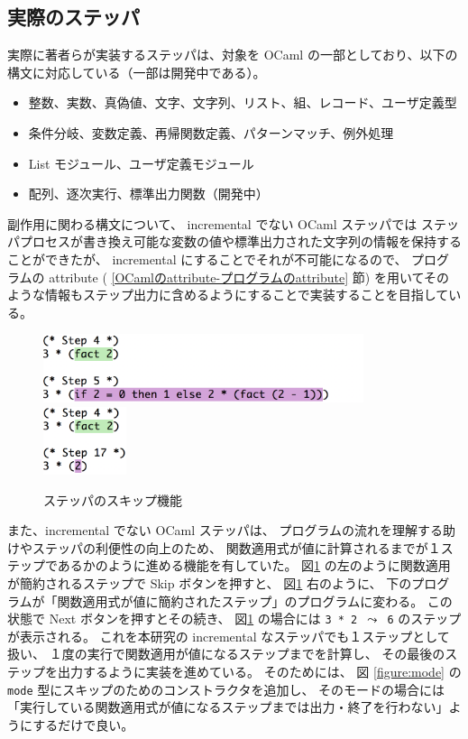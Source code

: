 \subsection{実際のステッパ}
\label{実装-実際のステッパ}

実際に著者らが実装するステッパは、対象を OCaml の一部としており、以下の構文に対応している（一部は開発中である）。
\begin{itemize}
\item 整数、実数、真偽値、文字、文字列、リスト、組、レコード、ユーザ定義型
\item 条件分岐、変数定義、再帰関数定義、パターンマッチ、例外処理
\item List モジュール、ユーザ定義モジュール
\item 配列、逐次実行、標準出力関数（開発中）
\end{itemize}

副作用に関わる構文について、
incremental でない OCaml ステッパでは
ステッパプロセスが書き換え可能な変数の値や標準出力された文字列の情報を保持することができたが、
incremental にすることでそれが不可能になるので、
プログラムの attribute ( \ref{OCamlのattribute-プログラムのattribute} 節)
を用いてそのような情報もステップ出力に含めるようにすることで実装することを目指している。

\begin{figure}
  \includegraphics[height=2cm]{5/skip1.png}
  \includegraphics[height=2cm]{5/skip2.png}
  \caption{ステッパのスキップ機能}
  \label{figure:skip}
\end{figure}

また、incremental でない OCaml ステッパは、
プログラムの流れを理解する助けやステッパの利便性の向上のため、
関数適用式が値に計算されるまでが１ステップであるかのように進める機能を有していた。
図\ref{figure:skip} の左のように関数適用が簡約されるステップで Skip ボタンを押すと、
図\ref{figure:skip} 右のように、
下のプログラムが「関数適用式が値に簡約されたステップ」のプログラムに変わる。
この状態で Next ボタンを押すとその続き、
図\ref{figure:skip} の場合には \texttt{3 * 2 $\leadsto$ 6} のステップが表示される。
これを本研究の incremental なステッパでも１ステップとして扱い、
１度の実行で関数適用が値になるステップまでを計算し、
その最後のステップを出力するように実装を進めている。
そのためには、
図 \ref{figure:mode} の \texttt{mode} 型にスキップのためのコンストラクタを追加し、
そのモードの場合には「実行している関数適用式が値になるステップまでは出力・終了を行わない」ようにするだけで良い。
